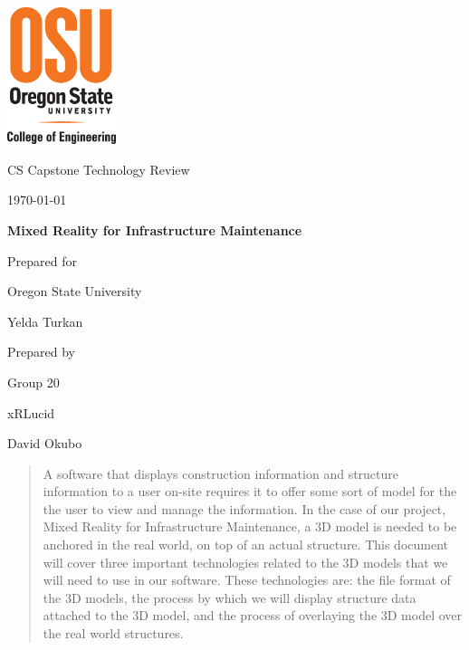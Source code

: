 \documentclass[onecolumn, draftclsnofoot,10pt, compsoc]{IEEEtran}
\def \CapstoneTeamName{         xRLucid}
\def \CapstoneTeamNumber{       20}
\def \GroupMemberOne{           David Okubo}
\def \GroupMemberTwo{           Thomas Kuhn}
\def \GroupMemberThree{         Karl Popper}
\def \CapstoneProjectName{      Mixed Reality for Infrastructure Maintenance}
\def \CapstoneSponsorCompany{   Oregon State University}
\def \CapstoneSponsorPerson{    Yelda Turkan}
\def \DocType{		%
				Technology Review
				}
\newcommand{\NameSigPair}[1]{\par
\makebox[2.75in][r]{#1} \hfil 	\makebox[3.25in]{\makebox[2.25in]{\hrulefill} \hfill		\makebox[.75in]{\hrulefill}}
\par\vspace{-12pt} \textit{\tiny\noindent
\makebox[2.75in]{} \hfil		\makebox[3.25in]{\makebox[2.25in][r]{Signature} \hfill	\makebox[.75in][r]{Date}}}}
\renewcommand{\NameSigPair}[1]{#1}
\begin{document}
\begin{titlepage}
    \begin{singlespace}
        \includegraphics[height=4cm]{coe_v_spot1}
        \hfill 
        \par\vspace{.2in}
        \centering
        \scshape{
            \huge CS Capstone \DocType \par
            {\large\today}\par
            \vspace{.5in}
            \textbf{\Huge\CapstoneProjectName}\par
            \vfill
            {\large Prepared for}\par
            \Huge \CapstoneSponsorCompany\par
            \vspace{5pt}
            {\Large\NameSigPair{\CapstoneSponsorPerson}\par}
            {\large Prepared by }\par
            Group\CapstoneTeamNumber\par
            \CapstoneTeamName\par 
            \vspace{5pt}
            {\Large
                \NameSigPair{\GroupMemberOne}\par
            }
            \vspace{20pt}
        }
        \begin{abstract}
        	A software that displays construction information and structure information to a user on-site requires it to offer some sort of model for the the user to view and manage the information. In the case of our project, Mixed Reality for Infrastructure Maintenance, a 3D model is needed to be anchored in the real world, on top of an actual structure. This document will cover three important technologies related to the 3D models that we will need to use in our software. These technologies are: the file format of the 3D models, the process by which we will display structure data attached to the 3D model, and the process of overlaying the 3D model over the real world structures.
        \end{abstract}     
    \end{singlespace}
\end{titlepage}
\end{document}
